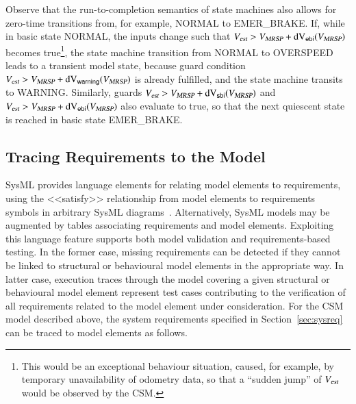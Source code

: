 Observe that the run-to-completion semantics of state machines also allows for zero-time
 transitions from, for example, {\sf NORMAL} to {\sf EMER\_BRAKE}. If,
 while in basic state {\sf NORMAL},  the inputs change such that
 ${V_{\text{\sl est}}} > {V_{\text{\sl MRSP}}}+\text{dV}_{\mathsf{ebi}}({V_{\text{\sl MRSP}}})$ becomes true\footnote{This would be an
   exceptional behaviour situation, caused, for example, by temporary
   unavailability of odometry data, so that a ``sudden jump'' of
   ${V_{\text{\sl est}}}$ would be observed by the CSM.}, the state machine
 transition from {\sf NORMAL} to {\sf OVERSPEED} leads to a transient
 model state, because guard condition ${V_{\text{\sl est}}} > {V_{\text{\sl MRSP}}}+\text{dV}_{\mathsf{warning}}({V_{\text{\sl MRSP}}})$ is already
 fulfilled, and the state machine transits to {\sf
   WARNING}. Similarly, guards ${V_{\text{\sl est}}} > {V_{\text{\sl MRSP}}}+\text{dV}_{\mathsf{sbi}}({V_{\text{\sl MRSP}}})$ and ${V_{\text{\sl est}}} >
 {V_{\text{\sl MRSP}}}+\text{dV}_{\mathsf{ebi}}({V_{\text{\sl MRSP}}})$ also evaluate to true, so that the next quiescent state
 is reached in basic state {\sf EMER\_BRAKE}.



 



\subsection{Tracing Requirements to the Model}

SysML provides language elements for relating model elements to requirements, using the {\sf <<satisfy>>} relationship from model elements to requirements symbols in arbitrary SysML diagrams~\cite[Section~16]{SysML12}. Alternatively, SysML models may be augmented by
tables associating requirements and model elements. Exploiting this language feature supports both model validation and requirements-based testing.
In the former case, missing requirements can be detected if they
cannot be linked to structural or behavioural model elements in the
appropriate way. In latter case, execution traces through the model covering a
given structural or behavioural model element represent test cases
contributing to the verification of all requirements related to the
model element under consideration. 
For the CSM model described above, the system requirements specified in 
Section~\ref{sec:sysreq} can be traced to model elements as follows.










